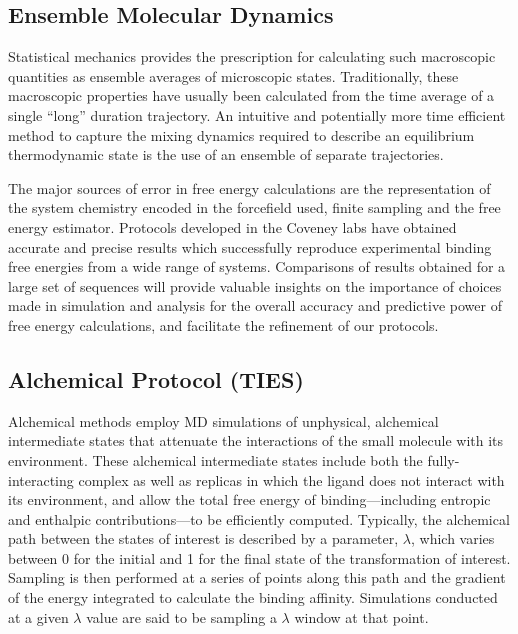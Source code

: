 \documentclass[conference]{IEEEtran}
\begin{document}
\subsection{Ensemble Molecular Dynamics}\label{sec:emd}

Statistical mechanics provides the prescription for calculating such macroscopic quantities as ensemble averages of microscopic states. Traditionally, these macroscopic properties have usually been calculated from the time average of a single “long” duration trajectory. An intuitive and potentially more time efficient method to capture the mixing dynamics required to describe an equilibrium thermodynamic state is the use of an ensemble of separate trajectories. \cite{Coveney2016}

The major sources of error in free energy calculations are the representation of the system chemistry encoded in the forcefield used, finite sampling and the free energy estimator. Protocols developed in the Coveney labs have obtained accurate and precise results which successfully reproduce experimental binding free energies from a wide range of systems. \cite{Wright2014, Wan2017brd4, Wan2015, Wan2011} 
Comparisons of results obtained for a large set of sequences will provide valuable insights on the importance of choices made in simulation and analysis for the overall accuracy and predictive power of free energy calculations, and facilitate the refinement of our protocols.


\subsection{Alchemical Protocol (TIES)}\label{sec:ties}

Alchemical methods employ MD simulations of unphysical, alchemical intermediate states that attenuate the interactions of the small molecule with its environment. 
These alchemical intermediate states include both the fully-interacting complex as well as replicas in which the ligand does not interact with its environment, and allow the total free energy of binding—including entropic and enthalpic contributions—to be efficiently computed. Typically, the alchemical path between the states of interest is described by a parameter, $\lambda$, which varies between 0 for the initial and 1 for the final state of the transformation of interest. 
Sampling is then performed at a series of points along this path and the gradient of the energy integrated to calculate the binding affinity.
Simulations conducted at a given $\lambda$ value are said to be sampling a $\lambda$ window at that point.
\end{document}
